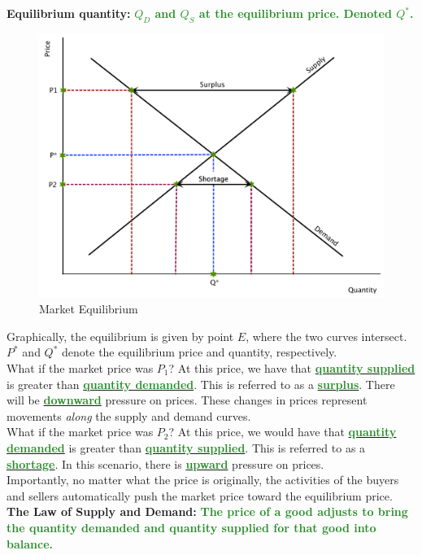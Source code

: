 \documentclass[11pt]{article}\usepackage[]{graphicx}\usepackage[]{color}
\theoremstyle{definition}
\newcommand{\ddp}[1]{{\textbf{\textcolor{ForestGreen}{#1}}}}
\newcommand{\dd}[1]{{\underline{\textbf{\textcolor{ForestGreen}{#1}}}}}
\newcommand{\defn}[1]{\textbf{#1}}
\begin{document}
		\defn{Equilibrium quantity:} \ddp{$Q_D$ and $Q_S$ at the equilibrium price. Denoted $Q^*$.\\}
		
			\begin{figure}[H]
				\centering
				\includegraphics[scale=.40]{plot13.pdf}
				\caption{Market Equilibrium}
			\end{figure}
		
		
		Graphically, the equilibrium is given by point $E$, where the two curves intersect. $P^*$ and $Q^*$ denote the equilibrium price and quantity, respectively.
		\\
		
		What if the market price was $P_1$? At this price, we  have that \dd{quantity supplied} is greater than \dd{quantity demanded}. This is referred to as a \dd{surplus}. There will be \dd{downward} pressure on prices. These changes in prices represent movements \textit{along} the supply and demand curves.
		\\
		
		What if the market price was $P_2$? At this price, we would have that \dd{quantity demanded} is greater than \dd{quantity supplied}. This is referred to as a \dd{shortage}. In this scenario, there is \dd{upward} pressure on prices. 
		\\
		
		Importantly, no matter what the price is originally, the activities of the buyers and sellers automatically push the market price toward the equilibrium price.
		\\
		
		\defn{The Law of Supply and Demand:} \ddp{The price of a good adjusts to bring the quantity demanded and quantity supplied for that good into balance. \\}
\end{document}
